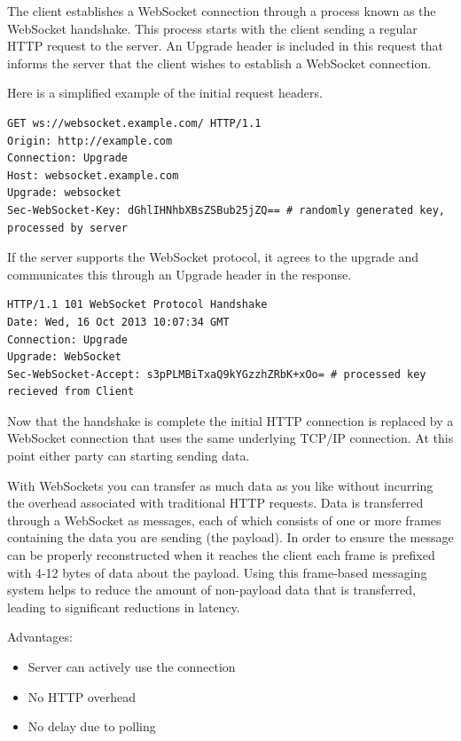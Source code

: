 \documentclass[11pt]{article}
\begin{document}
The client establishes a WebSocket connection through a process known as the WebSocket handshake. This process starts with the client sending a regular HTTP request to the server. An Upgrade header is included in this request that informs the server that the client wishes to establish a WebSocket connection.

Here is a simplified example of the initial request headers.
\lstset{breaklines=true,language=sh,label= ,caption= ,captionpos=b,numbers=none}
\begin{lstlisting}
GET ws://websocket.example.com/ HTTP/1.1
Origin: http://example.com
Connection: Upgrade
Host: websocket.example.com
Upgrade: websocket
Sec-WebSocket-Key: dGhlIHNhbXBsZSBub25jZQ== # randomly generated key, processed by server
\end{lstlisting}
If the server supports the WebSocket protocol, it agrees to the upgrade and communicates this through an Upgrade header in the response.
\lstset{breaklines=true,language=sh,label= ,caption= ,captionpos=b,numbers=none}
\begin{lstlisting}
HTTP/1.1 101 WebSocket Protocol Handshake
Date: Wed, 16 Oct 2013 10:07:34 GMT
Connection: Upgrade
Upgrade: WebSocket
Sec-WebSocket-Accept: s3pPLMBiTxaQ9kYGzzhZRbK+xOo= # processed key recieved from Client
\end{lstlisting}
Now that the handshake is complete the initial HTTP connection is replaced by a WebSocket connection that uses the same underlying TCP/IP connection. At this point either party can starting sending data.

With WebSockets you can transfer as much data as you like without incurring the overhead associated with traditional HTTP requests. Data is transferred through a WebSocket as messages, each of which consists of one or more frames containing the data you are sending (the payload). In order to ensure the message can be properly reconstructed when it reaches the client each frame is prefixed with 4-12 bytes of data about the payload. Using this frame-based messaging system helps to reduce the amount of non-payload data that is transferred, leading to significant reductions in latency.

Advantages:
\begin{itemize}
\item Server can actively use the connection
\item No HTTP overhead
\item No delay due to polling
\end{itemize}
\end{document}
